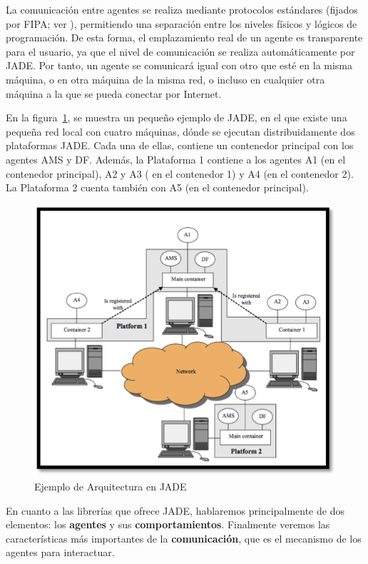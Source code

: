 La comunicación entre agentes se realiza mediante protocolos estándares (fijados por FIPA; ver \cite{fipa}), permitiendo una separación entre los niveles físicos y lógicos de programación. De esta forma, el emplazamiento real de un agente es transparente para el usuario, ya que el nivel de comunicación se realiza automáticamente por JADE. Por tanto, un agente se comunicará igual con otro que esté en la misma máquina, o en otra máquina de la misma red, o incluso en cualquier otra máquina a la que se pueda conectar por Internet.

En la figura~\ref{fig:arquitecturaJade}, se muestra un pequeño ejemplo de JADE, en el que existe una pequeña red local con cuatro máquinas, dónde se ejecutan distribuidamente dos plataformas JADE. Cada una de ellas, contiene un contenedor principal con los agentes AMS y DF. Además, la Plataforma 1 contiene a los agentes A1 (en el contenedor principal), A2 y A3 ( en el contenedor 1) y A4 (en el contenedor 2). La Plataforma 2 cuenta también con A5 (en el contenedor principal).

\begin{figure}[t]
\centering
\includegraphics[scale=1]{img/6/arquitecturaJade}
\caption{Ejemplo de Arquitectura en JADE
\label{fig:arquitecturaJade}}
\end{figure}


En cuanto a las librerías que ofrece JADE, hablaremos principalmente de dos elementos: los {\bf agentes} y sus {\bf comportamientos}. Finalmente veremos las características más importantes de la {\bf comunicación}, que es el mecanismo de los agentes para interactuar.

